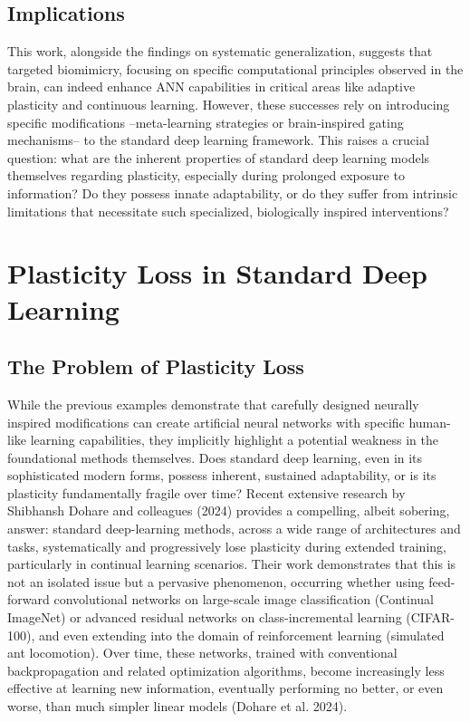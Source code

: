 \documentclass[
10pt, %
a4paper, %
oneside, %
headinclude,footinclude, %
BCOR5mm, %
]{scrartcl}
\begin{document}
\subsection{Implications}

This work, alongside the findings on systematic generalization, suggests that targeted biomimicry, focusing on specific computational principles observed in the brain, can indeed enhance ANN capabilities in critical areas like adaptive plasticity and continuous learning. However, these successes rely on introducing specific modifications –meta-learning strategies or brain-inspired gating mechanisms– to the standard deep learning framework. This raises a crucial question: what are the inherent properties of standard deep learning models themselves regarding plasticity, especially during prolonged exposure to information? Do they possess innate adaptability, or do they suffer from intrinsic limitations that necessitate such specialized, biologically inspired interventions?


\section{Plasticity Loss in Standard Deep Learning}

\subsection{The Problem of Plasticity Loss}

While the previous examples demonstrate that carefully designed neurally inspired modifications can create artificial neural networks with specific human-like learning capabilities, they implicitly highlight a potential weakness in the foundational methods themselves. Does standard deep learning, even in its sophisticated modern forms, possess inherent, sustained adaptability, or is its plasticity fundamentally fragile over time? Recent extensive research by Shibhansh Dohare and colleagues (2024) provides a compelling, albeit sobering, answer: standard deep-learning methods, across a wide range of architectures and tasks, systematically and progressively lose plasticity during extended training, particularly in continual learning scenarios. Their work demonstrates that this is not an isolated issue but a pervasive phenomenon, occurring whether using feed-forward convolutional networks on large-scale image classification (Continual ImageNet) or advanced residual networks on class-incremental learning (CIFAR-100), and even extending into the domain of reinforcement learning (simulated ant locomotion). Over time, these networks, trained with conventional backpropagation and related optimization algorithms, become increasingly less effective at learning new information, eventually performing no better, or even worse, than much simpler linear models (Dohare et al. 2024).
\end{document}
